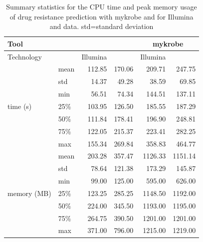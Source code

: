 \begin{table}
\centering
\begin{tabular}{|l|l|r|r|r|r|}
\hline
\multicolumn{2}{|l|}{Tool}       & \multicolumn{2}{c|}{\drprg{}} & \multicolumn{2}{c|}{mykrobe} \\ \hline
\multicolumn{2}{|l|}{Technology} & Illumina     & \ont{}    & Illumina      & \ont{}     \\ \hline
\multirow{7}{*}{time (s)}    & mean  & 112.85       & 170.06      & 209.71        & 247.75       \\ \cline{2-6} 
                         & std   & 14.37        & 49.28       & 38.59         & 69.85        \\ \cline{2-6} 
                         & min   & 56.51        & 74.34       & 144.51        & 137.11       \\ \cline{2-6} 
                         & 25\%  & 103.95       & 126.50      & 185.55        & 187.29       \\ \cline{2-6} 
                         & 50\%  & 111.84       & 178.41      & 196.90        & 248.81       \\ \cline{2-6} 
                         & 75\%  & 122.05       & 215.37      & 223.41        & 282.25       \\ \cline{2-6} 
                         & max   & 155.34       & 269.84      & 358.83        & 464.77       \\ \hline
\multirow{7}{*}{memory (MB)}  & mean  & 203.28       & 357.47      & 1126.33       & 1151.14      \\ \cline{2-6} 
                         & std   & 78.64        & 121.38      & 173.29        & 145.87       \\ \cline{2-6} 
                         & min   & 99.00        & 125.00      & 595.00        & 626.00       \\ \cline{2-6} 
                         & 25\%  & 123.25       & 285.25      & 1148.50       & 1192.00      \\ \cline{2-6} 
                         & 50\%  & 224.00       & 345.50      & 1193.00       & 1195.00      \\ \cline{2-6} 
                         & 75\%  & 264.75       & 390.50      & 1201.00       & 1201.00      \\ \cline{2-6} 
                         & max   & 371.00       & 796.00      & 1215.00       & 1219.00      \\ \hline
\end{tabular}
\caption{Summary statistics for the CPU time and peak memory usage of drug resistance prediction with mykrobe and \drprg{} for Illumina and \ont{} data. std=standard deviation}
\label{tab:predict-comp-pref}
\end{table}

